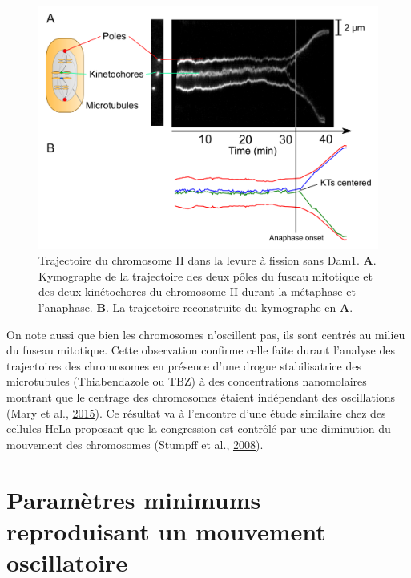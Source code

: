 \documentclass[12pt,a4paper,twoside,openright]{book}
\begin{document}
\begin{figure}[htbp]
\centering
\includegraphics{figures/annexes/dam1-traj.png}
\caption[Trajectoire du chromosome II dans la levure à fission sans Dam1]{\label{fig:dam1-traj}Trajectoire
du chromosome II dans la levure à fission sans Dam1. \textbf{A}.
Kymographe de la trajectoire des deux pôles du fuseau mitotique et des
deux kinétochores du chromosome II durant la métaphase et l'anaphase.
\textbf{B}. La trajectoire reconstruite du kymographe en \textbf{A}.}
\end{figure}

On note aussi que bien les chromosomes n'oscillent pas, ils sont centrés
au milieu du fuseau mitotique. Cette observation confirme celle faite
durant l'analyse des trajectoires des chromosomes en présence d'une
drogue stabilisatrice des microtubules (Thiabendazole ou TBZ) à des
concentrations nanomolaires montrant que le centrage des chromosomes
étaient indépendant des oscillations (Mary et al.,
\protect\hyperlink{ref-Mary2015}{2015}). Ce résultat va à l'encontre
d'une étude similaire chez des cellules HeLa proposant que la
congression est contrôlé par une diminution du mouvement des chromosomes
(Stumpff et al., \protect\hyperlink{ref-Stumpff2008}{2008}).

\cleardoublepage
\clearpage\null

\section{Paramètres minimums reproduisant un mouvement
oscillatoire}\label{paramuxe8tres-minimums-reproduisant-un-mouvement-oscillatoire}
\end{document}
